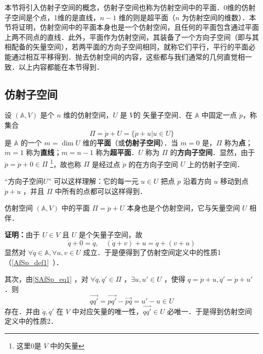 
\begin{issues}
\issueTODO
\end{issues}

本节将引入仿射子空间的概念，仿射子空间也称为仿射空间中的平面．0维的仿射子空间是个点，1维的是直线，$n-1$ 维的则是超平面（$n$ 为仿射空间的维数）．本节将证明，仿射空间中的平面本身也是一个仿射空间，且任何的平面包含通过平面上两不同点的直线．此外，平面作为仿射空间，其装备了一个方向子空间（即与其相配备的矢量空间），若两平面的方向子空间相同，就称它们平行，平行的平面必能通过相互平移得到．抛去仿射空间的内容，这些都与我们通常的几何直觉相一致．以上内容都能在本节得到．
\subsection{仿射子空间}
\begin{definition}{}
设 $(\mathbb A,V)$ 是个 $n$ 维的仿射空间，$U$ 是 $V$的 矢量子空间．在 $\mathbb A$ 中固定一点 $\dot p$，称集合
\begin{equation}\label{SAfSp_eq1}
\Pi=\dot p+U=\{\dot p+u|u\in U\}
\end{equation}
是 $\mathbb A$ 的一个 $m=\dim U$ 维的\textbf{平面}（或\textbf{仿射子空间}）．当 $m=0$ 是，$\Pi$ 称为\textbf{点}；$m=1$ 称为\textbf{直线}；$m=n-1$ 称为\textbf{超平面}．$U$ 称为 $\Pi$ 的\textbf{方向子空间}．显然，由于 $\dot p=\dot p+0\in \Pi$ \footnote{这里0是 $V$ 中的矢量}，故也称 $\Pi$ 是经过点 $\dot p$ 的在方向子空间 $U$ 上的仿射子空间．
\end{definition}
“方向子空间$U$” 可以这样理解：它的每一元 $u\in U$ 把点 $\dot p$ 沿着方向 $u$ 移动到点 $\dot p+u$ ，并且 $\Pi$ 中所有的点都可以这样得到．

\begin{theorem}{}
仿射空间 $(\mathbb A,V)$ 中的平面 $\Pi=\dot p+U$ 本身也是个仿射空间，它与矢量空间 $U$ 相伴．
\end{theorem}
\textbf{证明：}由于 $U\in V$ 且 $U$ 是个矢量子空间，故
\begin{equation}
\dot q+0=\dot q,\quad (\dot q+v)+u=\dot q+(v+u)
\end{equation}
显然对 $\forall \dot q\in\mathbb A,\forall u,v\in U$ 成立．于是便得到了仿射空间定义中的性质1（\autoref{AfSp_def1}~）．

其次，由\autoref{SAfSp_eq1} ，对 $\forall \dot q,\dot q'\in\Pi$ ，$\exists u,u'\in U$ ，使得 $\dot q=\dot p+u,\dot q'=\dot p+u'$．则
\begin{equation}
\vec{qq'}=\vec{pq'}-\vec{pq}=u'-u\in U
\end{equation}
存在．并由 $\dot q,\dot q'$ 在 $V$ 中对应矢量的唯一性，$\vec{qq'}\in U$ 必唯一．于是得到仿射空间定义中的性质2．


